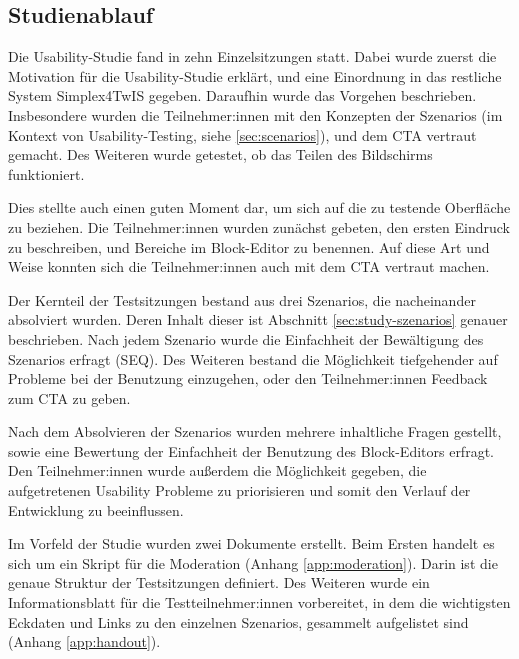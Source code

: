 \subsection{Studienablauf}

Die Usability-Studie fand in zehn Einzelsitzungen statt. Dabei wurde zuerst die Motivation für die Usability-Studie erklärt, und eine Einordnung in das restliche System Simplex4TwIS gegeben. Daraufhin wurde das Vorgehen beschrieben. Insbesondere wurden die Teilnehmer:innen mit den Konzepten der Szenarios (im Kontext von Usability-Testing, siehe \ref{sec:scenarios}), und dem \ac{CTA} vertraut gemacht. Des Weiteren wurde getestet, ob das Teilen des Bildschirms funktioniert.

Dies stellte auch einen guten Moment dar, um sich auf die zu testende Oberfläche zu beziehen. Die Teilnehmer:innen wurden zunächst gebeten, den ersten Eindruck zu beschreiben, und Bereiche im Block-Editor zu benennen. Auf diese Art und Weise konnten sich die Teilnehmer:innen auch mit dem \ac{CTA} vertraut machen.

Der Kernteil der Testsitzungen bestand aus drei Szenarios, die nacheinander absolviert wurden. Deren Inhalt dieser ist Abschnitt \ref{sec:study-szenarios} genauer beschrieben. Nach jedem Szenario wurde die Einfachheit der Bewältigung des Szenarios erfragt (\ac{SEQ}). Des Weiteren bestand die Möglichkeit tiefgehender auf Probleme bei der Benutzung einzugehen, oder den Teilnehmer:innen Feedback zum \ac{CTA} zu geben.

Nach dem Absolvieren der Szenarios wurden mehrere inhaltliche Fragen gestellt, sowie eine Bewertung der Einfachheit der Benutzung des Block-Editors erfragt. Den Teilnehmer:innen wurde außerdem die Möglichkeit gegeben, die aufgetretenen Usability Probleme zu priorisieren und somit den Verlauf der Entwicklung zu beeinflussen.

Im Vorfeld der Studie wurden zwei Dokumente erstellt. Beim Ersten handelt es sich um ein Skript für die Moderation (Anhang \ref{app:moderation}). Darin ist die genaue Struktur der Testsitzungen definiert. Des Weiteren wurde ein Informationsblatt für die Testteilnehmer:innen vorbereitet, in dem die wichtigsten Eckdaten und Links zu den einzelnen Szenarios, gesammelt aufgelistet sind (Anhang \ref{app:handout}).
